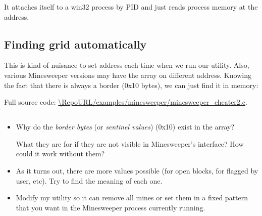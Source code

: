 It attaches itself to a win32 process by \ac{PID} and just reads process memory at the address.

\subsection{Finding grid automatically}

This is kind of nuisance to set address each time when we run our utility.
Also, various Minesweeper versions may have the array on different address.
Knowing the fact that there is always a border (0x10 bytes), we can just find it in memory:



Full source code: \url{\RepoURL/examples/minesweeper/minesweeper_cheater2.c}.

\subsection{\Exercises}

\begin{itemize}

\item 
Why do the \emph{border bytes} (or \emph{sentinel values}) (0x10) exist in the array?

What they are for if they are not visible in Minesweeper's interface?
How could it work without them?

\item 
As it turns out, there are more values possible (for open blocks, for flagged by user, etc).
Try to find the meaning of each one.

\item 
Modify my utility so it can remove all mines or set them in a fixed pattern that you want in the Minesweeper
process currently running.

\end{itemize}
